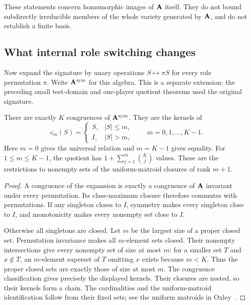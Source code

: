 These statements concern homomorphic images of $\mathbf A$ itself. They do not
bound subdirectly irreducible members of the whole variety generated by
$\mathbf A$, and do not establish a finite basis.

\subsection{What internal role switching changes}

Now expand the signature by unary operations $S\mapsto\pi S$ for every
role permutation $\pi$. Write $\mathbf A^{\mathrm{sym}}$ for this algebra. This
is a separate extension: the preceding small test-domain and one-player
quotient theorems used the original signature.

\begin{proposition}\label{view:thm:sym}
There are exactly $K$ congruences of $\mathbf A^{\mathrm{sym}}$. They are the
kernels of
\[
 c_m(S)=\begin{cases}S,&|S|\leq m,\\I,&|S|>m,\end{cases}
 \qquad m=0,1,\ldots,K-1.
\]
Here $m=0$ gives the universal relation and $m=K-1$ gives equality.
For $1\leq m\leq K-1$, the quotient has
$1+\sum_{j=1}^{m}\binom Kj$ values. These are the restrictions to
nonempty sets of the uniform-matroid closures of rank $m+1$.
\end{proposition}
\begin{proof}
A congruence of the expansion is exactly a congruence of $\mathbf A$ invariant
under every permutation. Its class-maximum closure therefore commutes
with permutations. If any singleton closes to $I$, symmetry makes every
singleton close to $I$, and monotonicity makes every nonempty set close
to $I$.

Otherwise all singletons are closed. Let $m$ be the largest size of a
proper closed set. Permutation invariance makes all $m$-element sets
closed. Their nonempty intersections give every nonempty set of size at
most $m$: for a smaller set $T$ and $x\notin T$, an $m$-element superset
of $T$ omitting $x$ exists because $m<K$. Thus the proper closed sets
are exactly those of size at most $m$. The congruence classification
gives precisely the displayed kernels. Their closures are nested, so
their kernels form a chain. The cardinalities and the uniform-matroid
identification follow from their fixed sets; see the uniform matroids
in Oxley~\cite{Oxley2011}.
\end{proof}

